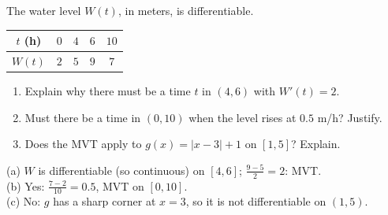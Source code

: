 \begin{exo}{}
The water level $W(t)$, in meters, is differentiable. \;\begin{tabular}{|c|c|c|c|c|}\hline$t$ (h)&$0$&$4$&$6$&$10$\\\hline$W(t)$&$2$&$5$&$9$&$7$\\\hline\end{tabular}
\begin{enumerate}[label=(\alph*)]
\item Explain why there must be a time $t$ in $(4,6)$ with $W'(t)=2$.
\item Must there be a time in $(0,10)$ when the level rises at $0.5$ m/h? Justify.
\item Does the MVT apply to $g(x)=|x-3|+1$ on $[1,5]$? Explain.
\end{enumerate}
\work{4.5cm}
\begin{solution}
(a) $W$ is differentiable (so continuous) on $[4,6]$; $\frac{9-5}{2}=2$: MVT.\\
(b) Yes: $\frac{7-2}{10}=0.5$, MVT on $[0,10]$.\\
(c) No: $g$ has a sharp corner at $x=3$, so it is not differentiable on $(1,5)$.
\end{solution}
\end{exo}

